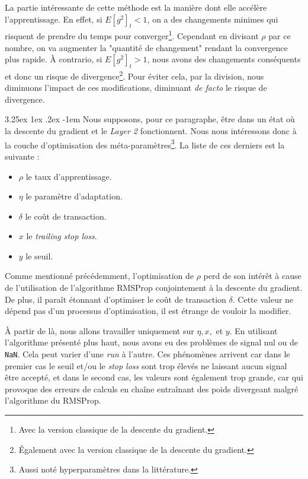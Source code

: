 \documentclass[a4paper, 11pt]{article}
\makeatletter
\renewcommand\paragraph{\@startsection{paragraph}{5}{\z@}%
  {3.25ex \@plus1ex \@minus.2ex}%
  {-1em}%
  {\normalfont\normalsize\bfseries}}
\makeatother
\begin{document}
  La partie intéressante de cette méthode est la manière dont elle accélère l'apprentissage. En effet, si $E[g^2]_t < 1$, on a des changements minimes 
  qui risquent de prendre du temps pour converger\footnote{Avec la version classique de la descente du gradient.}. Cependant en divisant $\rho$ par ce
  nombre, on va augmenter la "quantité de changement" rendant la convergence plus rapide. À contrario, si $E[g^2]_t > 1$, nous avons des changements 
  conséquents et donc un risque de divergence\footnote{Également avec la version classique de la descente du gradient.}. Pour éviter cela, par la division,
  nous diminuons l'impact de ces modifications, diminuant \textit{de facto} le risque de divergence.
  
  \paragraph{}
  Nous supposons, pour ce paragraphe, être dans un état où la descente du gradient et le \textit{Layer 2} fonctionnent. Nous nous intéressons donc à la couche 
  d'optimisation des méta-paramètres\footnote{Aussi noté hyperparamètres dans la littérature.}. La liste de ces derniers est la suivante :
  \begin{itemize}
   \item $\rho$ le taux d'apprentissage.
   \item $\eta$ le paramètre d'adaptation.
   \item $\delta$ le coût de transaction.
   \item $x$ le \textit{trailing stop loss}.
   \item $y$ le seuil.
  \end{itemize}

  Comme mentionné précédemment, l'optimisation de $\rho$ perd de son intérêt à cause de l'utilisation de l'algorithme RMSProp conjointement à la descente du
  gradient. De plus, il paraît étonnant d'optimiser le coût de transaction $\delta$. Cette valeur ne dépend pas d'un processus d'optimisation, il est
  étrange de vouloir la modifier.
  
  À partir de là, nous allons travailler uniquement sur $\eta,x,$ et $y$. En utilisant l'algorithme présenté plus haut, nous avons eu des problèmes
  de signal nul ou de \texttt{NaN}. Cela peut varier d'une \textit{run} à l'autre. Ces phénomènes arrivent car dans le premier cas le seuil et/ou le \textit{stop
  loss} sont trop élevés ne laissant aucun signal être accepté, et dans le second cas, les valeurs sont également trop grande, car qui provoque des erreurs
  de calculs en chaîne entraînant des poids divergeant malgré l'algorithme du RMSProp.
  
\end{document}
